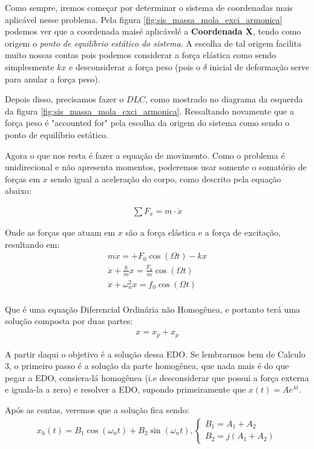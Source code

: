 \documentclass{article}
\begin{document}
Como sempre, iremos começar por determinar o sistema de coordenadas mais aplicável nesse problema. Pela figura \ref{fig:sis_massa_mola_exci_armonica} podemos ver que a coordenada maisé
aplicávelé a \textbf{Coordenada X}, tendo como origem o \emph{ponto de equilíbrio estático do sistema}. A escolha de tal origem facilita muito nossas contas pois podemos considerar a força
elástica como sendo simplesmente $kx$ e desconsiderar a força peso (pois o $\delta$ inicial de deformação serve para anular a força peso).

Depois disso, precisamos fazer o $DLC$, como mostrado no diagrama da esquerda da figura \ref{fig:sis_massa_mola_exci_armonica}. Ressaltando novamente que a força peso é "accounted
for" pela escolha da origem do sistema como sendo o ponto de equilíbrio estático.

Agora o que nos resta é fazer a equação de movimento. Como o problema é unidirecional e não apresenta momentos, poderemos usar somente o somatório de forças em $x$ sendo igual a aceleração
do corpo, como descrito pela equação abaixo:

\begin{align*}
    \sum F_x = m \cdot \ddot x
\end{align*}

Onde as forças que atuam em $x$ são a força elástica e a força de excitação, resultando em:
\begin{align*}
    m \ddot x  = + F_0 \cos(\Omega t) - kx                 \\
    \ddot x + \frac{k}{m}x = \frac{F_0}{m} \cos (\Omega t) \\
    \ddot x + \omega_n ^2 x = f_0 \cos (\Omega t)          \\
\end{align*}

Que é uma equação Diferencial Ordinária não Homogênea, e portanto terá uma solução composta por duas partes:
\begin{align*}
    x = x_p + x_p
\end{align*}

A partir daqui o objetivo é a solução dessa EDO. Se lembrarmos bem de Calculo 3, o primeiro passo é a solução da parte homogênea, que nada mais é do que pegar a EDO, consiera-lá homogênea
(i.e desconsiderar que possui a força externa e iguala-la a zero) e resolver a EDO, supondo primeiramente que $x(t) = A e^{\lambda t}$.

Após as contas, veremos que a solução fica sendo:
\begin{align*}
    x_h(t) = B_1 \cos(\omega_n t) + B_2 \sin (\omega_n t), \begin{cases}
                                                               B_1 = A_1 + A_2 \\
                                                               B_2 = j(A_1 + A_2)
                                                           \end{cases}
\end{align*}
\end{document}
